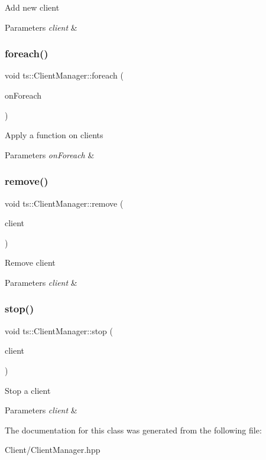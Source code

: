 Add new client 
\begin{DoxyParams}{Parameters}
{\em client} & \\
\hline
\end{DoxyParams}
\mbox{\label{classts_1_1_client_manager_a4bf9aa9c7ef6f10ae11a8c3408183ed3}} 
\subsubsection{\texorpdfstring{foreach()}{foreach()}}
{\footnotesize\ttfamily void ts\+::\+Client\+Manager\+::foreach (\begin{DoxyParamCaption}\item[{On\+Foreach\+Func}]{on\+Foreach }\end{DoxyParamCaption})}

Apply a function on clients 
\begin{DoxyParams}{Parameters}
{\em on\+Foreach} & \\
\hline
\end{DoxyParams}
\mbox{\label{classts_1_1_client_manager_a3d622eee3a7d3101d5c77f2dc5f241c2}} 
\subsubsection{\texorpdfstring{remove()}{remove()}}
{\footnotesize\ttfamily void ts\+::\+Client\+Manager\+::remove (\begin{DoxyParamCaption}\item[{Client\+Ptr \&}]{client }\end{DoxyParamCaption})}

Remove client 
\begin{DoxyParams}{Parameters}
{\em client} & \\
\hline
\end{DoxyParams}
\mbox{\label{classts_1_1_client_manager_a1622242546ab02fe20ad844c519cbc0a}} 
\subsubsection{\texorpdfstring{stop()}{stop()}}
{\footnotesize\ttfamily void ts\+::\+Client\+Manager\+::stop (\begin{DoxyParamCaption}\item[{Client\+Ptr \&}]{client }\end{DoxyParamCaption})}

Stop a client 
\begin{DoxyParams}{Parameters}
{\em client} & \\
\hline
\end{DoxyParams}


The documentation for this class was generated from the following file\+:\begin{DoxyCompactItemize}
\item 
Client/Client\+Manager.\+hpp\end{DoxyCompactItemize}
